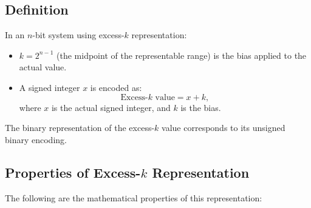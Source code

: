 \subsection{Definition}
In an \( n \)-bit system using excess-\( k \) representation:
\begin{itemize}
    \item \( k = 2^{n-1} \) (the midpoint of the representable range) is the bias applied to the actual value.
    \item A signed integer \( x \) is encoded as:
    \[
    \text{Excess-} k \text{ value} = x + k,
    \]
    where \( x \) is the actual signed integer, and \( k \) is the bias.
\end{itemize}

The binary representation of the excess-\( k \) value corresponds to its unsigned binary encoding.

\subsection{Properties of Excess-\( k \) Representation}

The following are the mathematical properties of this representation:

